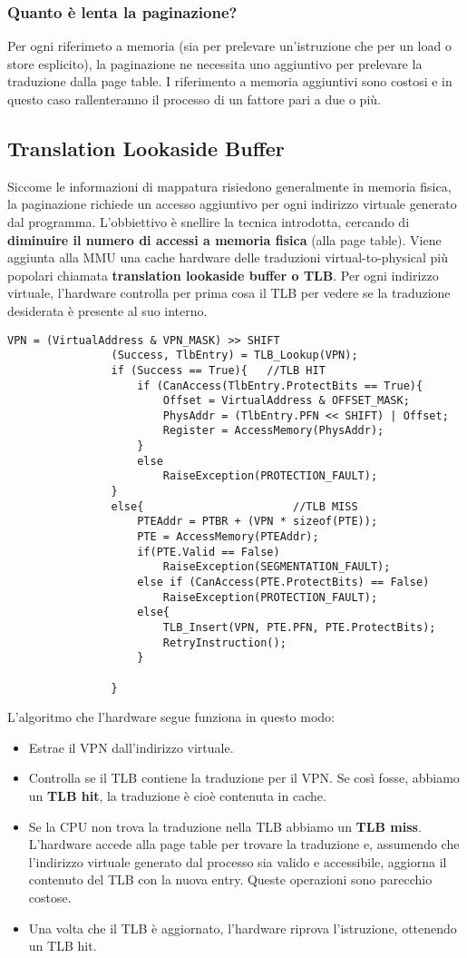\documentclass[12pt, letterpaper]{article}
\begin{document}
			\subsubsection{Quanto è lenta la paginazione?}
				Per ogni riferimeto a memoria (sia per prelevare un'istruzione che per un load o store esplicito), la paginazione ne necessita uno aggiuntivo per prelevare la traduzione dalla page table. I riferimento a memoria aggiuntivi sono costosi e in questo caso rallenteranno il processo di un fattore pari a due o più.
				
		\subsection{Translation Lookaside Buffer}
			Siccome le informazioni di mappatura risiedono generalmente in memoria fisica, la paginazione richiede un accesso aggiuntivo per ogni indirizzo virtuale generato dal programma. L'obbiettivo è snellire la tecnica introdotta, cercando di \textbf{diminuire il numero di accessi a memoria fisica }(alla page table). Viene aggiunta alla MMU una cache hardware delle traduzioni virtual-to-physical più popolari chiamata \textbf{translation lookaside buffer  o TLB}. Per ogni indirizzo virtuale, l'hardware controlla per prima cosa il TLB per vedere se la traduzione desiderata è presente al suo interno. 
			\begin{lstlisting}[style=CStyle]
				VPN = (VirtualAddress & VPN_MASK) >> SHIFT
				(Success, TlbEntry) = TLB_Lookup(VPN);
				if (Success == True){	//TLB HIT
					if (CanAccess(TlbEntry.ProtectBits == True){
						Offset = VirtualAddress & OFFSET_MASK;
						PhysAddr = (TlbEntry.PFN << SHIFT) | Offset;
						Register = AccessMemory(PhysAddr);				
					}
					else
						RaiseException(PROTECTION_FAULT);
				}	
				else{						//TLB MISS
					PTEAddr = PTBR + (VPN * sizeof(PTE));	
					PTE = AccessMemory(PTEAddr);
					if(PTE.Valid == False)
						RaiseException(SEGMENTATION_FAULT);
					else if (CanAccess(PTE.ProtectBits) == False)
						RaiseException(PROTECTION_FAULT);
					else{
						TLB_Insert(VPN, PTE.PFN, PTE.ProtectBits);
						RetryInstruction();
					}
								
				}
			\end{lstlisting}
			L'algoritmo che l'hardware segue funziona in questo modo: 
			\begin{itemize}
				\item Estrae il VPN dall'indirizzo virtuale.
				\item Controlla se il TLB contiene la traduzione per il VPN. Se così fosse, abbiamo un \textbf{TLB hit}, la traduzione è cioè contenuta in cache.
				\item Se la CPU non trova la traduzione nella TLB abbiamo un \textbf{TLB miss}. L'hardware accede alla page table per trovare la traduzione e, assumendo che l'indirizzo virtuale generato dal processo sia valido e accessibile, aggiorna il contenuto del TLB con la nuova entry. Queste operazioni sono parecchio costose.
				\item Una volta che il TLB è aggiornato, l'hardware riprova l'istruzione, ottenendo un TLB hit.
			\end{itemize}
			
\end{document}
